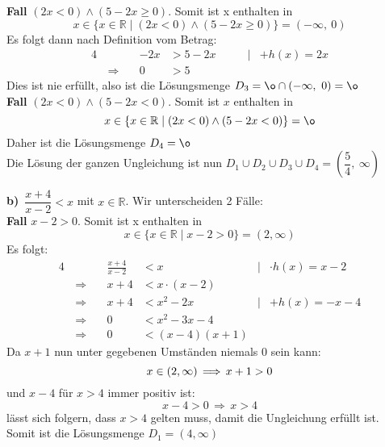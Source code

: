 \documentclass[a4paper,graphics,12pt]{article}
\begin{document}
\textbf{Fall} $(2x < 0) \land (5-2x \geq 0)$.
Somit ist x enthalten in
$$x\in \{x \in \mathbb{R} \mid (2x<0) \land (5-2x \geq 0)\} = (-\infty,\ 0)$$
Es folgt dann nach Definition vom Betrag:
\begin{alignat*}{4}
    &                       &-2x &> 5-2x\qquad      &|& +h(x)=2x \\[1pt]
    &\,\Longrightarrow\quad &0 &> 5     &&
\end{alignat*}
Dies ist nie erfüllt, also ist die Lösungsmenge $D_3 = \o \cap (-\infty,\ 0) = \o$\\

\textbf{Fall} $(2x < 0) \land (5-2x < 0)$.
Somit ist $x$ enthalten in
$$x\in \{x \in \mathbb{R} \mid (2x<0) \land (5-2x <0)\} = \o$$
Daher ist die Lösungsmenge $D_4 = \o$\\
Die Lösung der ganzen Ungleichung ist nun
$D_1 \cup D_2 \cup D_3 \cup D_4 = \left(\dfrac{5}{4},\ \infty\right)$ 

\newpage

\textbf{b)}\ $\dfrac{x+4}{x-2}<x$ mit $x\in\mathbb{R}$. Wir unterscheiden 2 Fälle:\\[10pt]
\textbf{Fall} $x-2 > 0$. Somit ist x enthalten in
$$ x \in \{x \in \mathbb{R} \mid x-2 > 0\} = (2,\infty)$$
Es folgt:
\begin{alignat*}{4}
    &                   &\frac{x+4}{x-2} &<x &|& \cdot h(x)=x-2 \\[1pt]
    &\,\Longrightarrow\quad     &x+4 &< x\cdot (x-2) && \\[1pt]
    &\,\Longrightarrow\         &x+4 &< x^2-2x \qquad&|& +h(x)=-x-4 \\[1pt]
    &\,\Longrightarrow\         &0 &< x^2-3x-4 && \\[1pt]
    &\,\Longrightarrow\         &0 &< (x-4)(x+1) &&
\end{alignat*}
Da $x+1$ nun unter gegebenen Umständen niemals 0 sein kann:
$$x \in (2,\infty) \,\Longrightarrow\, x+1 > 0\\$$
und $x-4$ für $x > 4$ immer positiv ist:
$$ x-4 > 0 \,\Longrightarrow\, x > 4$$
lässt sich folgern, dass $x > 4$  gelten muss, damit die Ungleichung erfüllt ist.\\
Somit ist die Lösungsmenge $D_1 = (4,\infty)$
\end{document}
